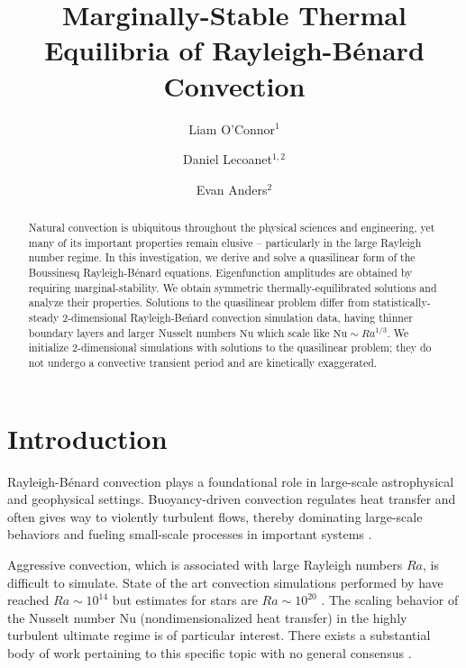 \documentclass[reprint,amsmath,amssymb,aps]{revtex4-1}
\newcommand\Nu{\mathrm{Nu}}
\begin{document}
\title{Marginally-Stable Thermal Equilibria of Rayleigh-Bénard Convection}

\author{Liam O'Connor$^1$}
\author{Daniel Lecoanet$^{1, 2}$}
\author{Evan Anders$^2$}

\begin{abstract}
Natural convection is ubiquitous throughout the physical sciences and engineering, yet many of its important properties remain elusive -- particularly in the large Rayleigh number regime.
In this investigation, we derive and solve a quasilinear form of the Boussinesq Rayleigh-B\'enard equations. 
Eigenfunction amplitudes are obtained by requiring marginal-stability. We obtain symmetric thermally-equilibrated solutions and analyze their properties. 
Solutions to the quasilinear problem differ from statistically-steady 2-dimensional Rayleigh-Be\'nard convection simulation data, having thinner boundary layers and larger Nusselt numbers $\Nu$ which scale like $\Nu \sim Ra^{1/3}$. 
We initialize 2-dimensional simulations with solutions to the quasilinear problem; they do not undergo a convective transient period and are kinetically exaggerated.
\end{abstract}


\maketitle

\section{Introduction}
Rayleigh-B\'enard convection plays a foundational role in large-scale astrophysical and geophysical settings.
Buoyancy-driven convection regulates heat transfer and often gives way to violently turbulent flows, thereby dominating large-scale behaviors and fueling small-scale processes in important systems \cite{Couston}.

Aggressive convection, which is associated with large Rayleigh numbers $Ra$, is difficult to simulate. 
State of the art convection simulations performed by \cite{Zhu_2018} have reached $Ra \sim 10^{14}$ but estimates for stars are $Ra \sim 10^{20}$ \cite{Ossendrijver}. 
The scaling behavior of the Nusselt number $\Nu$ (nondimensionalized heat transfer) in the highly turbulent ultimate regime is of particular interest.
There exists a substantial body of work pertaining to this specific topic with no general consensus \cite{Malkus_1954, Howard_1966, Kraichnan, Spiegel, Castaing, Grossman, Ahlers}. 
\end{document}

